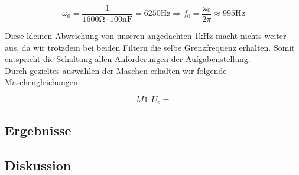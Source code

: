 $$\omega_{0}=\frac{1}{1600\si{\ohm}\cdot 100\si{\nano\farad}}=6250\si{\hertz}\Rightarrow f_{0}=\frac{\omega_{0}}{2\pi}\approx 995\si{\hertz}$$

Diese kleinen Abweichung von unseren angedachten 1\si{\kilo\hertz} macht nichts weiter aus, da wir trotzdem bei beiden Filtern die selbe Grenzfrequenz erhalten.
Somit entspricht die Schaltung allen Anforderungen der Aufgabenstellung.\\

Durch gezieltes auswählen der Maschen erhalten wir folgende Maschengleichungen:

$$M1:U_{e}=$$


\subsection{Ergebnisse}

\subsection{Diskussion}


